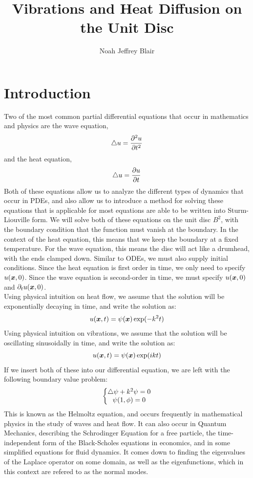 \documentclass{paper}
\author{Noah Jeffrey Blair}
\title{Vibrations and Heat Diffusion on the Unit Disc}
\begin{document}
\maketitle
\tableofcontents
\section{Introduction}
Two of the most common partial differential equations that occur in mathematics and physics are the wave equation,
\begin{equation}\bigtriangleup u=\frac{\partial ^2 u}{\partial t^2}\end{equation}
and the heat equation,
\begin{equation}\bigtriangleup u=\frac{\partial u}{\partial t}\end{equation}
Both of these equations allow us to analyze the different types of dynamics that occur in PDEs, and also allow us to introduce a method for solving these equations that is applicable for most equations are able to be written into Sturm-Liouville form. We will solve both of these equations on the unit disc $B^2$, with the boundary condition that the function must vanish at the boundary. In the context of the heat equation, this means that we keep the boundary at a fixed temperature. For the wave equation, this means the disc will act like a drumhead, with the ends clamped down. Similar to ODEs, we must also supply initial conditions. Since the heat equation is first order in time, we only need to specify $u(\bm{x},0)$. Since the wave equation is second-order in time, we must specify $u(\bm{x},0)$ and $\partial_{t}u(\bm{x},0)$.\\
Using physical intuition on heat flow, we assume that the solution will be exponentially decaying in time, and write the solution as:
\begin{equation}u(\bm{x},t)=\psi(\bm{x})\exp(-k^2 t)\end{equation}
Using physical intuition on vibrations, we assume that the solution will be oscillating sinusoidally in time, and write the solution as:
\begin{equation}u(\bm{x},t)=\psi(\bm{x})\exp(i k t)\end{equation}
If we insert both of these into our differential equation, we are left with the following boundary value problem:
\begin{equation}\left\{\begin{matrix}
    \bigtriangleup\psi +k^2\psi=0 \\
    \psi(1,\phi)=0
 \end{matrix}\right.\end{equation}
This is known as the Helmoltz equation, and occurs frequently in mathematical physics in the study of waves and heat flow. It can also occur in Quantum Mechanics, describing the Schrodinger Equation for a free particle, the time-independent form of the Black-Scholes equations in economics, and in some simplified equations for fluid dynamics. It comes down to finding the eigenvalues of the Laplace operator on some domain, as well as the eigenfunctions, which in this context are refered to as the normal modes.
\end{document}
